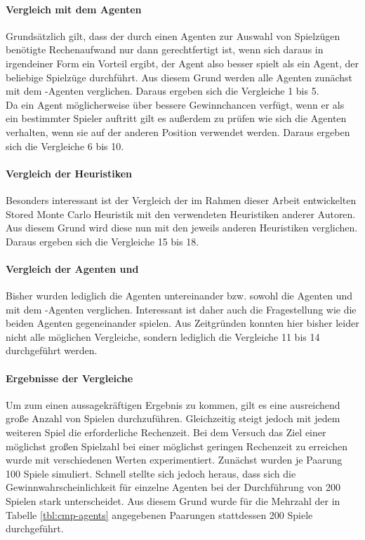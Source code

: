 \paragraph{Vergleich mit dem Agenten }
Grundsätzlich gilt, dass der durch einen Agenten zur Auswahl von Spielzügen benötigte Rechenaufwand nur dann gerechtfertigt ist, wenn sich daraus in irgendeiner Form ein Vorteil ergibt, der Agent also besser spielt als ein Agent, der beliebige Spielzüge durchführt. Aus diesem Grund werden alle Agenten zunächst mit dem -Agenten verglichen. Daraus ergeben sich die Vergleiche 1 bis 5.
\\Da ein Agent möglicherweise über bessere Gewinnchancen verfügt, wenn er als ein bestimmter Spieler auftritt gilt es außerdem zu prüfen wie sich die Agenten verhalten, wenn sie auf der anderen Position verwendet werden. Daraus ergeben sich die Vergleiche 6 bis 10.

\paragraph{Vergleich der Heuristiken}
Besonders interessant ist der Vergleich der im Rahmen dieser Arbeit entwickelten Stored Monte Carlo Heuristik mit den verwendeten Heuristiken anderer Autoren. Aus diesem Grund wird diese nun mit den jeweils anderen Heuristiken verglichen. Daraus ergeben sich die Vergleiche 15 bis 18.

\paragraph{Vergleich der Agenten \mxZitat{\abp} und }
Bisher wurden lediglich die Agenten \mxZitat{\abp} untereinander bzw. sowohl die Agenten \mxZitat{\abp} und  mit dem -Agenten verglichen. Interessant ist daher auch die Fragestellung wie die beiden Agenten gegeneinander spielen. Aus Zeitgründen konnten hier bisher leider nicht alle möglichen Vergleiche, sondern lediglich die Vergleiche 11 bis 14 durchgeführt werden.

\paragraph{Ergebnisse der Vergleiche}
\label{p:vgl-result}
Um zum einen aussagekräftigen Ergebnis zu kommen, gilt es eine ausreichend große Anzahl von Spielen durchzuführen. Gleichzeitig steigt jedoch mit jedem weiteren Spiel die erforderliche Rechenzeit. Bei dem Versuch das Ziel einer möglichst großen Spielzahl bei einer möglichst geringen Rechenzeit zu erreichen wurde mit verschiedenen Werten experimentiert. Zunächst wurden je Paarung 100 Spiele simuliert. Schnell stellte sich jedoch heraus, dass sich die Gewinnwahrscheinlichkeit für einzelne Agenten bei der Durchführung von 200 Spielen stark unterscheidet. Aus diesem Grund wurde für die Mehrzahl der in Tabelle \ref{tbl:cmp-agents} angegebenen Paarungen stattdessen 200 Spiele durchgeführt.

